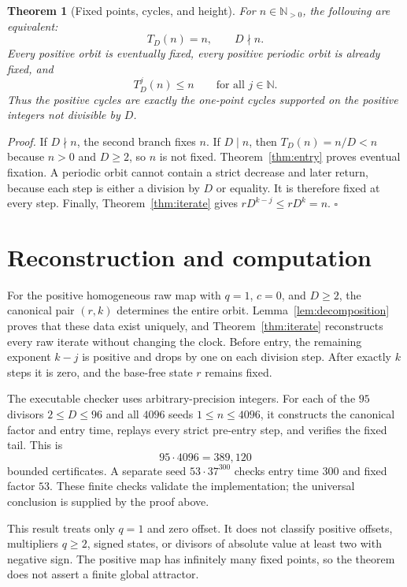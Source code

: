 \documentclass[11pt,letterpaper]{article}
\newcommand{\N}{\mathbb{N}}
\newtheorem{theorem}{Theorem}
\newenvironment{proof}{\noindent\textit{Proof.}}{\hfill\(\square\)}
\begin{document}
\begin{theorem}[Fixed points, cycles, and height]
\label{thm:classification}
For $n\in\N_{>0}$, the following are equivalent:
\[
 T_D(n)=n,
 \qquad D\nmid n.
\]
Every positive orbit is eventually fixed, every positive periodic orbit is
already fixed, and
\[
 T_D^j(n)\leq n
 \qquad\text{for all }j\in\N.
\]
Thus the positive cycles are exactly the one-point cycles supported on the
positive integers not divisible by $D$.
\end{theorem}

\begin{proof}
If $D\nmid n$, the second branch fixes $n$.  If $D\mid n$, then
$T_D(n)=n/D<n$ because $n>0$ and $D\geq2$, so $n$ is not fixed.
Theorem~\ref{thm:entry} proves eventual fixation.  A periodic orbit cannot
contain a strict decrease and later return, because each step is either a
division by $D$ or equality.  It is therefore fixed at every step.  Finally,
Theorem~\ref{thm:iterate} gives
$rD^{k-j}\leq rD^k=n$.
\end{proof}

\section{Reconstruction and computation}

For the positive homogeneous raw map with $q=1$, $c=0$, and $D\geq2$, the
canonical pair $(r,k)$ determines the entire orbit.
Lemma~\ref{lem:decomposition} proves that these data exist uniquely, and
Theorem~\ref{thm:iterate} reconstructs every raw iterate without changing the
clock.  Before entry, the remaining exponent $k-j$ is positive and drops by
one on each division step.  After exactly $k$ steps it is zero, and the
base-free state $r$ remains fixed.

The executable checker uses arbitrary-precision integers.  For each of the
$95$ divisors $2\leq D\leq96$ and all $4096$ seeds
$1\leq n\leq4096$, it constructs the canonical factor and entry time, replays
every strict pre-entry step, and verifies the fixed tail.  This is
\[
 95\cdot4096=389{,}120
\]
bounded certificates.  A separate seed $53\cdot37^{300}$ checks entry time
$300$ and fixed factor $53$.  These finite checks validate the implementation;
the universal conclusion is supplied by the proof above.

This result treats only $q=1$ and zero offset.  It does not classify positive
offsets, multipliers $q\geq2$, signed states, or divisors of absolute value
at least two with negative sign.  The positive map has infinitely many fixed
points, so the theorem does not assert a finite global attractor.
\end{document}
